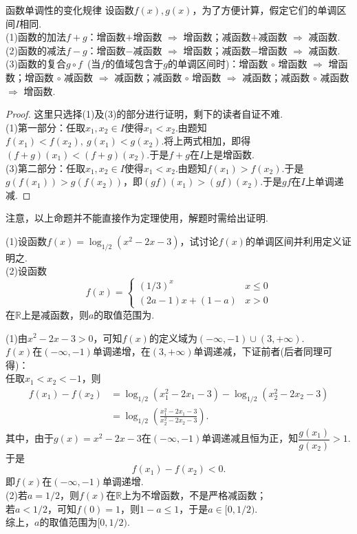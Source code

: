\documentclass[lang=cn, zihao=5]{elegantbook}
\newcommand{\ssb}[1]{\left( #1 \right)}
\newcommand{\R}{\mathbb{R}}
\newcommand{\tk}{\uline{\hspace{4em}}}
\begin{document}
\begin{proposition}{函数单调性的变化规律}
    设函数$f(x),g(x)$，为了方便计算，假定它们的单调区间$I$相同.\\
    (1)函数的加法$f+g$：增函数$+$增函数 $\Rightarrow$ 增函数；减函数$+$减函数 $\Rightarrow$ 减函数.\\
    (2)函数的减法$f-g$：增函数$-$减函数 $\Rightarrow$ 增函数；减函数$-$增函数 $\Rightarrow$ 减函数.\\
    (3)函数的复合$g \circ f$~(当$f$的值域包含于$g$的单调区间时)：增函数 $\circ$ 增函数 $\Rightarrow$ 增函数；增函数 $\circ$ 减函数 $\Rightarrow$ 减函数；减函数 $\circ$ 增函数 $\Rightarrow$ 减函数；减函数 $\circ$ 减函数 $\Rightarrow$ 增函数.
\end{proposition}
\begin{proof}
    这里只选择(1)及(3)的部分进行证明，剩下的读者自证不难. \\
    (1)第一部分：任取$x_1,x_2 \in I$使得$x_1 < x_2$.由题知$f(x_1) < f(x_2),~g(x_1) < g(x_2)$.将上两式相加，即得$(f+g)(x_1) < (f+g)(x_2)$.于是$f+g$在$I$上是增函数. \\
    (3)第二部分：任取$x_1,x_2 \in I$使得$x_1 < x_2$.由题知$f(x_1) > f(x_2)$.于是$g(f(x_1)) > g(f(x_2))$，即$(gf)(x_1) > (gf)(x_2)$.于是$gf$在$I$上单调递减.
\end{proof}
\begin{remark}
	注意，以上命题并不能直接作为定理使用，解题时需给出证明.
\end{remark}

\begin{example}
	(1)设函数$f(x)=\log_{1/2}(x^2-2x-3)$，试讨论$f(x)$的单调区间并利用定义证明之. \\
	(2)设函数$$f(x)=\begin{cases}
		(1/3)^x &x \leq 0 \\ (2a-1)x+(1-a) & x>0
	\end{cases}$$在$\R$上是减函数，则$a$的取值范围为\tk .
\end{example}
\begin{solution}
	(1)由$x^2-2x-3 > 0$，可知$f(x)$的定义域为$(-\infty ,-1) \cup (3,+\infty)$. \\
	$f(x)$在$(-\infty ,-1)$单调递增，在$(3,+\infty)$单调递减，下证前者(后者同理可得)： \\
	任取$x_1<x_2<-1$，则
	\begin{align*}
		f(x_1)-f(x_2) &= \log_{1/2}(x_1^2-2x_1-3) - \log_{1/2}(x_2^2-2x_2-3) \\
		&= \log_{1/2}\ssb{\frac{x_1^2-2x_1-3}{x_2^2-2x_2-3}}.
	\end{align*}
	其中，由于$g(x)=x^2-2x-3$在$(-\infty ,-1)$单调递减且恒为正，知$\dfrac{g(x_1)}{g(x_2)} > 1$.于是$$f(x_1)-f(x_2) < 0.$$
	即$f(x)$在$(-\infty ,-1)$单调递增. \\
	(2)若$a=1/2$，则$f(x)$在$\R$上为不增函数，不是严格减函数； \\
	若$a < 1/2$，可知$f(0)=1$，则$1-a \leq 1$，于是$a \in [0,1/2)$. \\
	综上，$a$的取值范围为$[0,1/2)$.
\end{solution}
\end{document}
